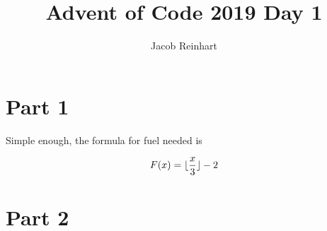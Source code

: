 \documentclass[12pt]{article}
\title{Advent of Code 2019 Day 1}
\author{Jacob Reinhart}
\DeclarePairedDelimiter\floor{\lfloor}{\rfloor}
\begin{document}
\maketitle

\section{Part 1}

Simple enough, the formula for fuel needed is 

$$F(x) = \floor{\frac{x}{3}} - 2$$

\section{Part 2} 
\end{document}
